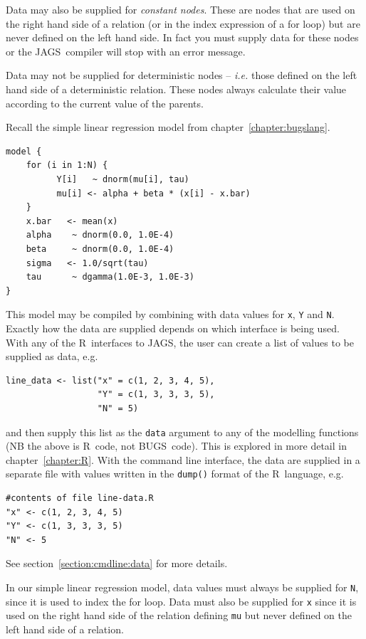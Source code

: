 \documentclass[11pt, a4paper, titlepage]{report}
\newcommand{\JAGS}{\textsf{JAGS}}
\newcommand{\BUGS}{\textsf{BUGS}}
\newcommand{\R}{\textsf{R}}
\begin{document}
Data may also be supplied for {\em constant nodes}. These are nodes
that are used on the right hand side of a relation (or in the index
expression of a for loop) but are never defined on the left hand
side. In fact you must supply data for these nodes or the
\JAGS\ compiler will stop with an error message.

Data may not be supplied for deterministic nodes -- {\em i.e.} those
defined on the left hand side of a deterministic relation. These nodes
always calculate their value according to the current value of the
parents. 

Recall the simple linear regression model from
chapter~\ref{chapter:bugslang}.
\begin{verbatim}
model {
    for (i in 1:N) {
          Y[i]   ~ dnorm(mu[i], tau)
          mu[i] <- alpha + beta * (x[i] - x.bar)
    }
    x.bar   <- mean(x)
    alpha    ~ dnorm(0.0, 1.0E-4)
    beta     ~ dnorm(0.0, 1.0E-4)
    sigma   <- 1.0/sqrt(tau)
    tau      ~ dgamma(1.0E-3, 1.0E-3)
}
\end{verbatim}
This model may be compiled by combining with data values for \texttt{x},
\texttt{Y} and \texttt{N}. Exactly how the data are supplied depends
on which interface is being used. With any of the \R\ interfaces to \JAGS,
the user can create a list of values to be supplied as data, e.g.
\begin{verbatim}
line_data <- list("x" = c(1, 2, 3, 4, 5),
                  "Y" = c(1, 3, 3, 3, 5),
                  "N" = 5)
\end{verbatim}
and then supply this list as the \texttt{data} argument to any of the
modelling functions (NB the above is \R\ code, not \BUGS\ code). This
is explored in more detail in chapter~\ref{chapter:R}. With the command
line interface, the data are supplied in a separate file with values
written in the \texttt{dump()} format of the \R\ language, e.g.
\begin{verbatim}
#contents of file line-data.R
"x" <- c(1, 2, 3, 4, 5)
"Y" <- c(1, 3, 3, 3, 5)
"N" <- 5
\end{verbatim}
See section~\ref{section:cmdline:data} for more details.

In our simple linear regression model, data values must always be
supplied for \texttt{N}, since it is used to index the for loop.  Data
must also be supplied for \texttt{x} since it is used on the right hand 
side of the relation defining \texttt{mu} but never defined on the left 
hand side of a relation.

\end{document}
